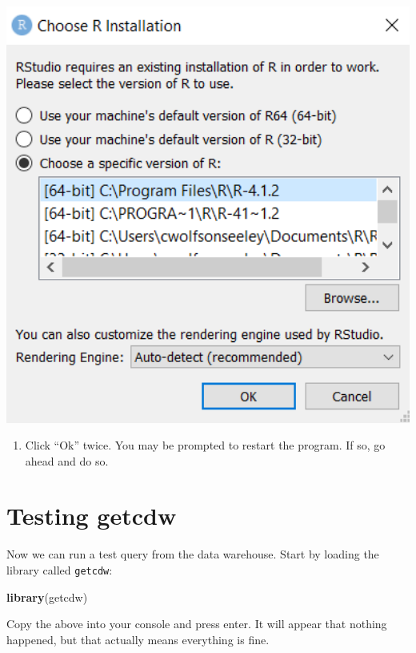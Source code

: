 \documentclass[]{book}
\newenvironment{Shaded}{\begin{snugshade}}{\end{snugshade}}
\newcommand{\KeywordTok}[1]{\textcolor[rgb]{0.13,0.29,0.53}{\textbf{#1}}}
\newcommand{\NormalTok}[1]{#1}
\providecommand{\tightlist}{%
  \setlength{\itemsep}{0pt}\setlength{\parskip}{0pt}}
\begin{document}
\includegraphics[width=5.53in]{images/version}

\begin{enumerate}
\def\labelenumi{\arabic{enumi})}
\setcounter{enumi}{2}
\tightlist
\item
  Click ``Ok'' twice. You may be prompted to restart the program. If so, go ahead and do so.
\end{enumerate}

\hypertarget{testing-getcdw}{%
\section{Testing getcdw}\label{testing-getcdw}}

Now we can run a test query from the data warehouse. Start by loading the library called \texttt{getcdw}:

\begin{Shaded}
\begin{Highlighting}[]
\KeywordTok{library}\NormalTok{(getcdw)}
\end{Highlighting}
\end{Shaded}

Copy the above into your console and press enter. It will appear that nothing happened, but that actually means everything is fine.
\end{document}
